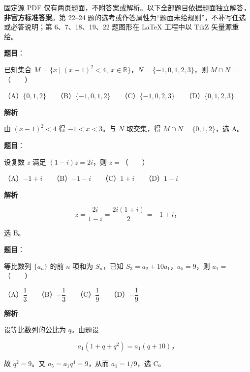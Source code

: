 

\begin{gktip}
固定源 PDF 仅有两页题面，不附答案或解析。以下全部题目依据题面独立解答，\textbf{非官方标准答案}。第 22–24 题的选考或作答属性为“题面未给规则”，不补写任选或必答说明；第 6、7、18、19、22 题图形在 LaTeX 工程中以 TikZ 矢量源重绘。
\end{gktip}


\begin{answer}

\textbf{题目}：

已知集合 $M=\{x\mid(x-1)^2<4,\ x\in\mathbb R\}$，$N=\{-1,0,1,2,3\}$，则 $M\cap N=$\mbox{（　　）}

（A）$\{0,1,2\}$　　（B）$\{-1,0,1,2\}$　　（C）$\{-1,0,2,3\}$　　（D）$\{0,1,2,3\}$

\textbf{解析}

由 $(x-1)^2<4$ 得 $-1<x<3$。与 $N$ 取交集，得 $M\cap N=\{0,1,2\}$，选 A。


\end{answer}
\begin{answer}

\textbf{题目}：

设复数 $z$ 满足 $(1-i)z=2i$，则 $z=$\mbox{（　　）}

（A）$-1+i$　　（B）$-1-i$　　（C）$1+i$　　（D）$1-i$

\textbf{解析}

\nopagebreak[4]
\[z=\frac{2i}{1-i}=\frac{2i(1+i)}2=-1+i\text{，}\]

选 B。


\end{answer}
\begin{answer}

\textbf{题目}：

等比数列 $\{a_n\}$ 的前 $n$ 项和为 $S_n$，已知 $S_3=a_2+10a_1$，$a_5=9$，则 $a_1=$\mbox{（　　）}

（A）$\dfrac13$　　（B）$-\dfrac13$　　（C）$\dfrac19$　　（D）$-\dfrac19$

\textbf{解析}

设等比数列的公比为 $q$。由题设

\nopagebreak[4]
\[a_1(1+q+q^2)=a_1(q+10)\text{，}\]

故 $q^2=9$。又 $a_5=a_1q^4=9$，从而 $a_1=1/9$，选 C。


\end{answer}
